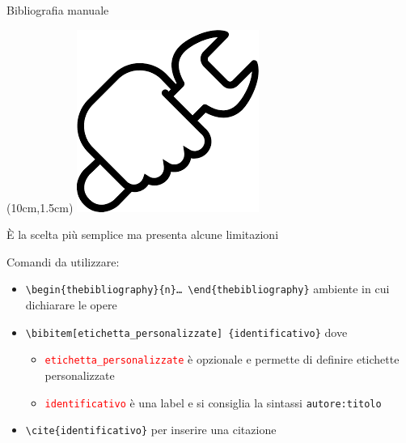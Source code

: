 \begin{frame}{Bibliografia manuale}

\begin{textblock*}{2cm}(10cm,1.5cm)
      \includegraphics[scale=0.30]{res/images/manual}
\end{textblock*}

È la scelta più semplice ma presenta alcune limitazioni

\vfill

Comandi da utilizzare:
\begin{itemize}
	\item \texttt{\textbackslash{}begin\{thebibliography\}\{n\}\dots{}
	\textbackslash{}end\{thebibliography\}} ambiente in cui dichiarare le opere
	\item \texttt{\textbackslash{}bibitem[etichetta\_personalizzate]
	\{identificativo\}} dove
	\begin{itemize}
		\item \textcolor{red}{\texttt{etichetta\_personalizzate}} è opzionale
		e permette di definire etichette personalizzate
		\item \textcolor{red}{\texttt{identificativo}} è una label e si
		consiglia la sintassi \texttt{autore:titolo}
	\end{itemize}
	\item \texttt{\textbackslash{}cite\{identificativo\}} per inserire una
	citazione
\end{itemize}

\end{frame}